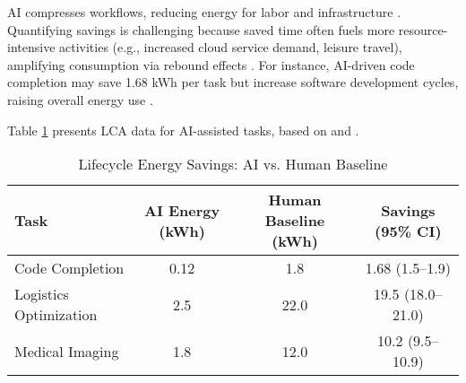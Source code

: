 \documentclass[12pt]{article}
\theoremstyle{plain}
\begin{document}
AI compresses workflows, reducing energy for labor and infrastructure \citep{Koomey2011}. Quantifying savings is challenging because saved time often fuels more resource-intensive activities (e.g., increased cloud service demand, leisure travel), amplifying consumption via rebound effects \citep{Sorrell2009, Jevons1865, Brookes1990}. For instance, AI-driven code completion may save 1.68 kWh per task but increase software development cycles, raising overall energy use \citep{Hilty2014}.

Table \ref{tab:lca} presents LCA data for AI-assisted tasks, based on \citet{Strubell2019} and \citet{IEA2023}.

\begin{table}[h]
\centering
\caption{Lifecycle Energy Savings: AI vs. Human Baseline}
\label{tab:lca}
\begin{tabular}{lccc}
\toprule
Task & AI Energy (kWh) & Human Baseline (kWh) & Savings (95\% CI) \\
\midrule
Code Completion & 0.12 & 1.8 & 1.68 (1.5--1.9) \\
Logistics Optimization & 2.5 & 22.0 & 19.5 (18.0--21.0) \\
Medical Imaging & 1.8 & 12.0 & 10.2 (9.5--10.9) \\
\bottomrule
\end{tabular}
\end{table}
\end{document}
